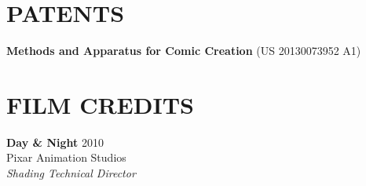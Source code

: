 \documentclass[line,margin]{res}
\begin{document}
\begin{resume}







\section{PATENTS}

\newcommand{\patent}[2] {
	\textbf{#1} (#2)
}

\patent
{Methods and Apparatus for Comic Creation}
{US 20130073952 A1}


\section{FILM CREDITS}

\newcommand{\filmcred}[4] {
	\textbf{#1} \hfill #2
	\\
	#3
	\\
	\emph{#4}
}

\filmcred
{Day \& Night}
{2010}
{Pixar Animation Studios}
{Shading Technical Director}





\end{resume}
\end{document}
